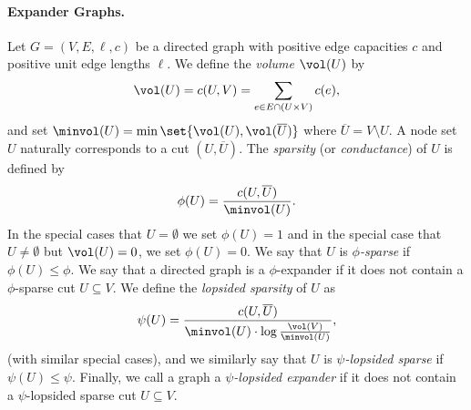 \paragraph{Expander Graphs.}
Let $G = (V, E, \ell, c)$ be a directed graph with positive edge capacities $c$ and positive unit edge lengths $\ell$. We define the \emph{volume $\vol(U)$} by
\begin{equation*}
	\vol(U) = c(U, V) = \sum_{e \in E \cap (U \times V)} c(e),
\end{equation*}
and set $\minvol(U) = \min\set{\vol(U), \vol(\overline U)}$ where $\overline U = V \setminus U$. A node set $U$ naturally corresponds to a cut $(U, \overline U)$. The \emph{sparsity} (or \emph{conductance}) of $U$ is defined by
\begin{equation*}
	\phi(U) = \frac{c(U, \overline U)}{\minvol(U)}.
\end{equation*}
In the special cases that $U = \emptyset$ we set $\phi(U) = 1$ and in the special case that $U \neq \emptyset$ but $\vol(U) = 0$, we set $\phi(U) = 0$.
We say that $U$ is \emph{$\phi$-sparse} if $\phi(U) \leq \phi$. We say that a directed graph is a $\phi$-expander if it does not contain a $\phi$-sparse cut $U \subseteq V$. 
We define the \emph{lopsided sparsity} of $U$ as
\begin{equation*}
	\psi(U) = \frac{c(U, \overline U)}{\minvol(U) \cdot \log \frac{\vol(V)}{\minvol(U)}},
\end{equation*}
(with similar special cases), and we similarly say that $U$ is \emph{$\psi$-lopsided sparse} if $\psi(U) \leq \psi$. Finally, we call a graph a \emph{$\psi$-lopsided expander} if it does not contain a $\psi$-lopsided sparse cut $U \subseteq V$.

